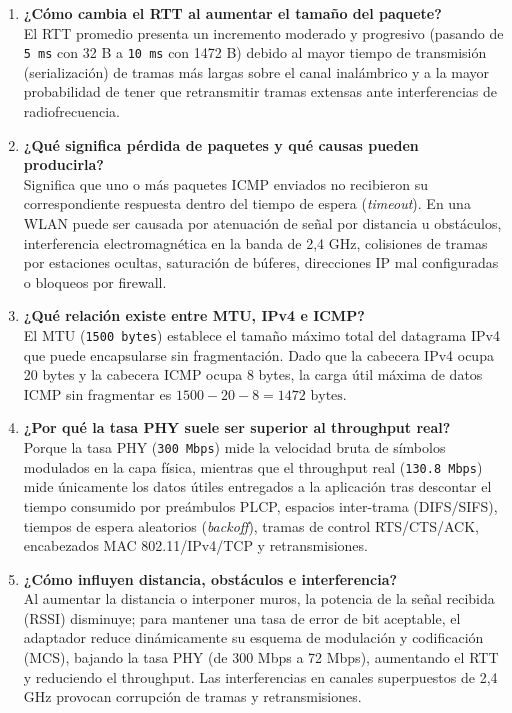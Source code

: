\documentclass[11pt, a4paper]{article}
\begin{document}
\begin{enumerate}
    \item \textbf{¿Cómo cambia el RTT al aumentar el tamaño del paquete?} \\
    El RTT promedio presenta un incremento moderado y progresivo (pasando de \texttt{5 ms} con 32 B a \texttt{10 ms} con 1472 B) debido al mayor tiempo de transmisión (serialización) de tramas más largas sobre el canal inalámbrico y a la mayor probabilidad de tener que retransmitir tramas extensas ante interferencias de radiofrecuencia.
    \item \textbf{¿Qué significa pérdida de paquetes y qué causas pueden producirla?} \\
    Significa que uno o más paquetes ICMP enviados no recibieron su correspondiente respuesta dentro del tiempo de espera (\textit{timeout}). En una WLAN puede ser causada por atenuación de señal por distancia u obstáculos, interferencia electromagnética en la banda de 2,4 GHz, colisiones de tramas por estaciones ocultas, saturación de búferes, direcciones IP mal configuradas o bloqueos por firewall.
    \item \textbf{¿Qué relación existe entre MTU, IPv4 e ICMP?} \\
    El MTU (\texttt{1500 bytes}) establece el tamaño máximo total del datagrama IPv4 que puede encapsularse sin fragmentación. Dado que la cabecera IPv4 ocupa 20 bytes y la cabecera ICMP ocupa 8 bytes, la carga útil máxima de datos ICMP sin fragmentar es $1500 - 20 - 8 = 1472\text{ bytes}$.
    \item \textbf{¿Por qué la tasa PHY suele ser superior al throughput real?} \\
    Porque la tasa PHY (\texttt{300 Mbps}) mide la velocidad bruta de símbolos modulados en la capa física, mientras que el throughput real (\texttt{130.8 Mbps}) mide únicamente los datos útiles entregados a la aplicación tras descontar el tiempo consumido por preámbulos PLCP, espacios inter-trama (DIFS/SIFS), tiempos de espera aleatorios (\textit{backoff}), tramas de control RTS/CTS/ACK, encabezados MAC 802.11/IPv4/TCP y retransmisiones.
    \item \textbf{¿Cómo influyen distancia, obstáculos e interferencia?} \\
    Al aumentar la distancia o interponer muros, la potencia de la señal recibida (RSSI) disminuye; para mantener una tasa de error de bit aceptable, el adaptador reduce dinámicamente su esquema de modulación y codificación (MCS), bajando la tasa PHY (de 300 Mbps a 72 Mbps), aumentando el RTT y reduciendo el throughput. Las interferencias en canales superpuestos de 2,4 GHz provocan corrupción de tramas y retransmisiones.

\end{enumerate}
\end{document}
